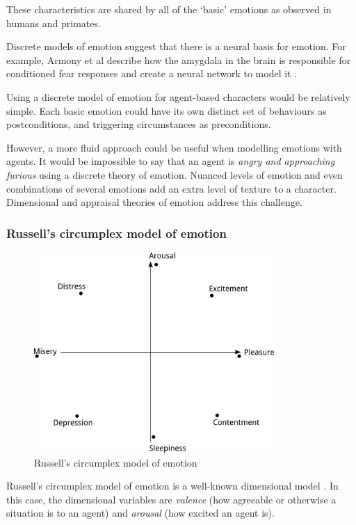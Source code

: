 These characteristics are shared by all of the `basic' emotions as observed in humans and primates.

Discrete models of emotion suggest that there is a neural basis for emotion. For example, Armony et al describe how the amygdala in the brain is responsible for conditioned fear responses  and create a neural network to model it \citep{armony1997computational}.

Using a discrete model of emotion for agent-based characters would be relatively simple. Each basic emotion could have its own distinct set of behaviours as postconditions, and triggering circumstances as preconditions.

However, a more fluid approach could be useful when modelling emotions with agents. It would be impossible to say that an agent is \emph{angry and approaching furious} using a discrete theory of emotion. Nuanced levels of emotion and even combinations of several emotions add an extra level of texture to a character. Dimensional and appraisal theories of emotion address this challenge.

\subsubsection{Russell's circumplex model of emotion}\label{sec:circumplex}
\begin{figure}[!t]
\centerline{\includegraphics[height=3in]{circumplex.png}}
\caption{Russell's circumplex model of emotion} \label{fig:circumplex}
\end{figure}

Russell's circumplex model of emotion is a well-known dimensional model \citep{russell1980circumplex}. In this case, the dimensional variables are \emph{valence} (how agreeable or otherwise a situation is to an agent) and \emph{arousal} (how excited an agent is).

